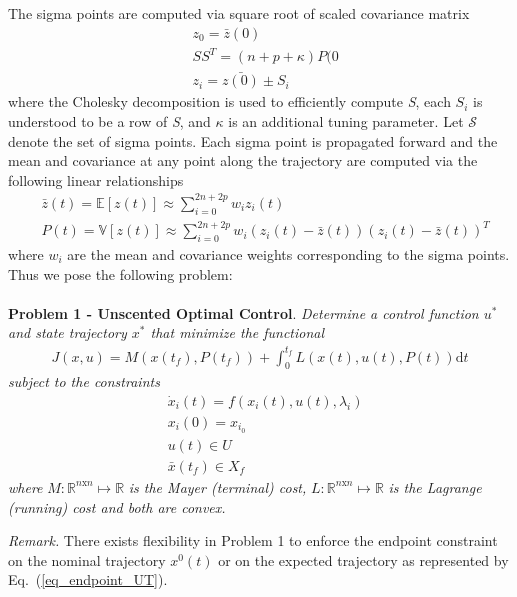 \documentclass[10pt,a4paper]{article}
\begin{document}
	The sigma points are computed via square root of scaled covariance matrix 
	\begin{align}
	&z_0 = \bar{z}(0) \\
	&SS^T = (n+p+\kappa)P(0 \\
	&z_i = \bar{z(0)} \pm S_i 
	\end{align}
	where the Cholesky decomposition is used to efficiently compute \textit{S}, each $S_i$ is understood to be a row of \textit{S}, and $\kappa$ is an additional tuning parameter. Let $\mathcal{S}$ denote the set of sigma points. Each sigma point is propagated forward and the mean and covariance at any point along the trajectory are computed via the following linear relationships
	\begin{align}
	&\bar{z}(t) = \mathbb{E}[z(t)] \approx \sum_{i=0}^{2n+2p}w_iz_i(t) \\
	&P(t) = \mathbb{V}[z(t)] \approx \sum_{i=0}^{2n+2p}w_i(z_i(t) - \bar{z}(t))(z_i(t) - \bar{z}(t))^T
	\end{align}
	where $w_i$ are the mean and covariance weights corresponding to the sigma points.
	Thus we pose the following problem:
	\\\\
	\textbf{Problem 1 - Unscented Optimal Control}. \textit{Determine a control function $ u^* $ and state trajectory $ x^* $ that minimize the functional}
		\begin{align}
		J(x,u) = M(x(t_f),P(t_f)) + \int_{0}^{t_f}L(x(t),u(t),P(t))\mathrm{d}t
		\end{align}
		\textit{	subject to the constraints }
		\begin{align}
		&\dot{x}_i(t) = f(x_i(t),u(t),\lambda_i) \\
		&x_i(0) = x_{i_0} \\
		&u(t) \in U \\
		&\bar{x}(t_f) \in X_f \label{eq_endpoint_UT}
		\end{align}
	\textit{where} $ M:\mathbb{R}^{n\mathrm{x}n}\mapsto \mathbb{R} $ \textit{is the Mayer (terminal) cost,}  $L:\mathbb{R}^{n\mathrm{x}n}\mapsto\mathbb{R}$ \textit{ is the Lagrange (running) cost and both are convex.}
		
	\textit{Remark.} There exists flexibility in Problem 1 to enforce the endpoint constraint on the nominal trajectory $x^0(t)$ or on the expected trajectory as represented by Eq.~(\ref{eq_endpoint_UT}).
	
	
\end{document}
